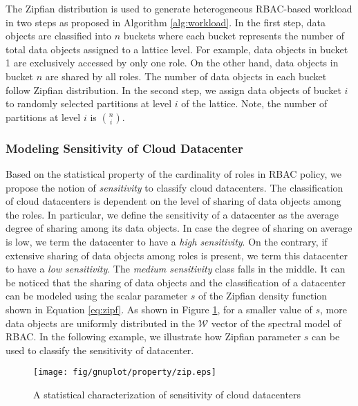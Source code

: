 The Zipfian distribution is used to generate heterogeneous RBAC-based workload in two steps as proposed in Algorithm \ref{alg:workload}.  In the first step, data objects are classified into $n$ buckets where each bucket represents the number of total data objects assigned to a lattice level. For example, data objects in bucket 1 are exclusively  accessed by only one role.  On the other hand, data objects in bucket $n$ are shared by all roles.  The number of data objects in each bucket follow Zipfian distribution. In the second step, we assign data objects of bucket  $i$ to randomly selected partitions at level $i$ of the lattice. Note, the number of partitions at level $i$ is $n \choose i$. 


\subsubsection{Modeling Sensitivity of Cloud Datacenter}
\label{subsec:sens}
Based on the statistical property of the cardinality of roles in RBAC policy, we propose the notion of \textit{sensitivity} to classify cloud datacenters. The classification of cloud datacenters is dependent on the level of sharing of data objects among the roles. In particular, we define the sensitivity of a datacenter as the average degree of sharing among its data objects. In case the degree of sharing on average is low, we term the datacenter to have a \textit{high sensitivity}. On the contrary, if extensive sharing of data objects among roles is present, we term this datacenter to have a \textit{low sensitivity}. The \textit{medium sensitivity} class falls in the  middle. It can be noticed that the sharing of data objects and the classification of a datacenter can be modeled using the scalar parameter $s$ of the Zipfian density function shown in Equation \ref{eq:zipf}. As shown in Figure \ref{fig:lattice_graph}, for a smaller value of $s$, more data objects are uniformly distributed in the $\mathcal{W}$ vector of the spectral model of RBAC. In the following example, we illustrate how Zipfian parameter $s$ can be used to classify the sensitivity of datacenter. 

\begin{figure}[t!]
  \centering 
	\texttt{[image: fig/gnuplot/property/zip.eps]}
  \caption{A statistical characterization of sensitivity of cloud datacenters}
  \vspace{-1.0em}
  \label{fig:lattice_graph}
\end{figure}

